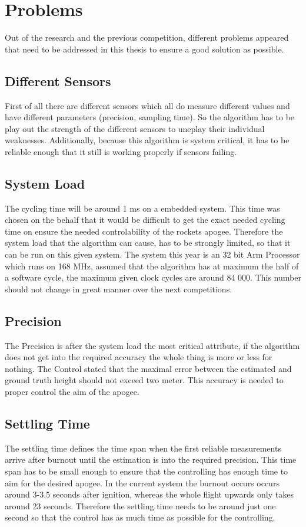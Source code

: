  
 \section{Problems}
 Out of the research and the previous competition, different problems appeared that need to be addressed in this thesis to ensure a good solution as possible.
 
 \subsection{Different Sensors}
 First of all there are different sensors which all do measure different values and have different parameters (precision, sampling time).
 So the algorithm has to be play out the strength of the different sensors to uneplay their individual weaknesses.
 Additionally, because this algorithm is system critical, it has to be reliable enough that it still is working properly if sensors failing. 
 
 \subsection{System Load}
 The cycling time will be around 1 ms on a embedded system. This time was chosen on the behalf that it would be difficult to get the exact needed cycling time on ensure the needed controlability of the rockets apogee.
 Therefore the system load that the algorithm can cause, has to be strongly limited, so that it can be run on this given system. 
 The system this year is an 32 bit Arm Processor which runs on 168 MHz, assumed that the algorithm has at maximum the half of a software cycle, the maximum given clock cycles are around 84 000.
 This number should not change in great manner over the next competitions.
 
 \subsection{Precision}
 The Precision is after the system load the most critical attribute, if the algorithm does not get into the required accuracy the whole thing is more or less for nothing.
 The Control stated that the maximal error between the estimated and ground truth height should not exceed two meter. This accuracy is needed to proper control the aim of the apogee.
 
 \subsection{Settling Time}
 The settling time defines the time span when the first reliable measurements arrive after burnout until the estimation is into the required precision.
 This time span has to be small enough to ensure that the controlling has enough time to aim for the desired apogee. In the current system the burnout occurs 
 occurs around 3-3.5 seconds after ignition, whereas the whole flight upwards only takes around 23 seconds. Therefore the settling time needs to be around just
 one second so that the control has as much time as possible for the controlling.
 
